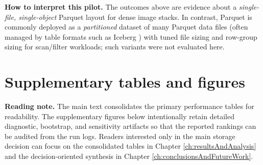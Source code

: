 \documentclass[nomenclature, english, bibtex]{kththesis}
\numberwithin{listing}{chapter}
\begin{document}
\textbf{How to interpret this pilot.} The outcomes above are evidence about a \emph{single-file, single-object} Parquet layout for dense image stacks. In contrast, Parquet is commonly deployed as a \emph{partitioned} dataset of many Parquet data files (often managed by table formats such as Iceberg \cite{iceberg_spec}) with tuned file sizing and row-group sizing for scan/filter workloads; such variants were not evaluated here.

\section{Supplementary tables and figures}
\noindent\textbf{Reading note.} The main text consolidates the primary performance tables for readability. The supplementary figures below intentionally retain detailed diagnostic, bootstrap, and sensitivity artifacts so that the reported rankings can be audited from the run logs. Readers interested only in the main storage decision can focus on the consolidated tables in Chapter \ref{ch:resultsAndAnalysis} and the decision-oriented synthesis in Chapter \ref{ch:conclusionsAndFutureWork}.

\label{app:supplementary}
\end{document}
